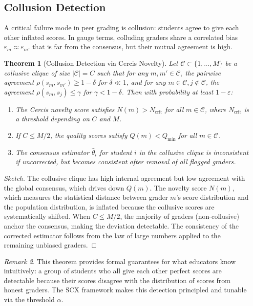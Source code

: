 \documentclass[12pt,a4paper]{article}
\newtheorem{theorem}{Theorem}[section]
\theoremstyle{remark}
\newtheorem{remark}[theorem]{Remark}
\begin{document}
\subsection{Collusion Detection}

A critical failure mode in peer grading is collusion: students agree to give each other inflated scores. In gauge terms, colluding graders share a correlated bias $\varepsilon_m \approx \varepsilon_{m'}$ that is far from the consensus, but their mutual agreement is high.

\begin{theorem}[Collusion Detection via Cercis Novelty]
\label{thm:collusion}
Let $\mathcal{C} \subset \{1,\dots,M\}$ be a collusive clique of size $|\mathcal{C}| = C$ such that for any $m,m' \in \mathcal{C}$, the pairwise agreement $\rho(s_m, s_{m'}) \geq 1 - \delta$ for $\delta \ll 1$, and for any $m \in \mathcal{C}, j \notin \mathcal{C}$, the agreement $\rho(s_m, s_j) \leq \gamma$ for $\gamma < 1 - \delta$. Then with probability at least $1 - \varepsilon$:
\begin{enumerate}
    \item The Cercis novelty score satisfies $N(m) > N_{\text{crit}}$ for all $m \in \mathcal{C}$, where $N_{\text{crit}}$ is a threshold depending on $C$ and $M$.
    \item If $C \leq M/2$, the quality scores satisfy $Q(m) < Q_{\text{min}}$ for all $m \in \mathcal{C}$.
    \item The consensus estimator $\hat{\theta}_i$ for student $i$ in the collusive clique is inconsistent if uncorrected, but becomes consistent after removal of all flagged graders.
\end{enumerate}
\end{theorem}

\begin{proof}[Sketch]
The collusive clique has high internal agreement but low agreement with the global consensus, which drives down $Q(m)$. The novelty score $N(m)$, which measures the statistical distance between grader $m$'s score distribution and the population distribution, is inflated because the collusive scores are systematically shifted. When $C \leq M/2$, the majority of graders (non-collusive) anchor the consensus, making the deviation detectable. The consistency of the corrected estimator follows from the law of large numbers applied to the remaining unbiased graders.
\end{proof}

\begin{remark}
This theorem provides formal guarantees for what educators know intuitively: a group of students who all give each other perfect scores are detectable because their scores disagree with the distribution of scores from honest graders. The SCX framework makes this detection principled and tunable via the threshold $\alpha$.
\end{remark}
\end{document}

